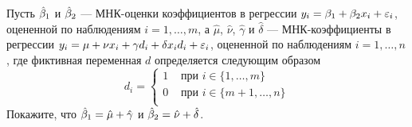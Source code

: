 \begin{problem}
Пусть $\hat{\beta}_1$ и $\hat{\beta}_2$ — МНК-оценки коэффициентов в регрессии $y_i = \beta_1 + \beta_2 x_i + \varepsilon_i$, оцененной по наблюдениям $i = 1, \ldots, m$, а $\hat{\mu}$, $\hat{\nu}$, $\hat{\gamma}$ и $\hat{\delta}$ — МНК-коэффициенты в регрессии $y_i = \mu + \nu x_i + \gamma d_i + \delta x_i d_i + \varepsilon_i$, оцененной по наблюдениям $i = 1, \ldots, n$, где фиктивная переменная $d$ определяется следующим образом
\[
d_i = \begin{cases}
1 & \text{ при } i \in \{1, \ldots, m\} \\
0 & \text{ при } i \in \{m + 1, \ldots, n\} \\
\end{cases}
\]
Покажите, что $\hat{\beta}_1 = \hat{\mu} + \hat{\gamma}$ и $\hat{\beta}_2 = \hat{\nu} + \hat{\delta}$.



\end{problem}
